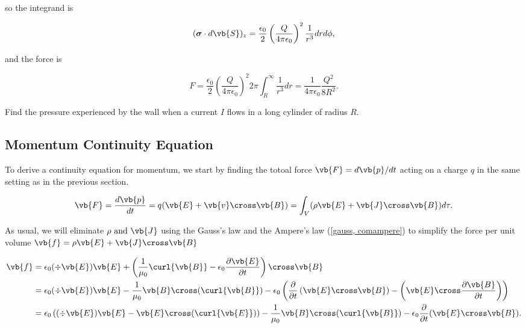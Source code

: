 \documentclass[english,a4paper,12pt]{report}
\begin{document}
{so the integrand is 

\begin{equation}
    (\boldsymbol{\sigma }\cdot d\vb{S}  )_{z} = \frac{\epsilon_0 }{2} \left( \frac{Q}{4\pi \epsilon_0 }  \right)^2 \frac{1}{r^3 }dr d\phi ,   
\end{equation}

and the force is 

\begin{equation}
    F = \frac{\epsilon_0 }{2} \left( \frac{Q}{4\pi \epsilon_0 }  \right)^2 2\pi \int_{R}^{\infty} \frac{1}{r^3 }dr = \frac{1}{4\pi \epsilon_0} \frac{Q^2}{8R^2}.     
\end{equation}
}


{Find the pressure experienced by the wall when a current \(I\) flows in a long cylinder of radius \(R\).}
{} 


\subsection{Momentum Continuity Equation}

To derive a continuity equation for momentum, we start by finding the totoal force \(\vb{F} = d\vb{p} /dt\) acting on a charge \(q\) in the same setting as in the previous section. 

\begin{equation}
    \vb{F} = \frac{d\vb{p} }{dt}  = q(\vb{E} + \vb{v} \cross \vb{B} ) = \int_{V}^{} (\rho \vb{E} + \vb{J} \cross \vb{B}) d\tau . 
\end{equation}

As usual, we will eliminate \(\rho \text { and } \vb{J} \) using the Gauss's law and the Ampere's law (\cref{gauss, comampere}) to simplify the force per unit volume \(\vb{f} = \rho \vb{E} + \vb{J} \cross \vb{B} \) 

\begin{equation}
    \begin{aligned}
        \vb{f}  &= \epsilon_0 (\div{\vb{E} } )\vb{E}  + \left( \frac{1}{\mu_0} \curl{\vb{B} } - \epsilon_0 \frac{\partial \vb{E} }{\partial t}    \right) \cross \vb{B} \\
        &= \epsilon_0 (\div{\vb{E} } )\vb{E}  - \frac{1}{\mu_0 }\vb{B} \cross (\curl{\vb{B} } ) - \epsilon_0 \left( \frac{\partial }{\partial t} \left( \vb{E} \cross \vb{B}  \right) - \left( \vb{E} \cross \frac{\partial \vb{B} }{\partial t}  \right) \right) \\
        &= \epsilon_0 \left( (\div{\vb{E} } )\vb{E}  - \vb{E} \cross (\curl{\vb{E} } ) \right) - \frac{1}{\mu_0} \vb{B} \cross (\curl{\vb{B} } ) - \epsilon_0 \frac{\partial }{\partial t} (\vb{E} \cross \vb{B} ).
    \end{aligned}
\end{equation}
\end{document}
